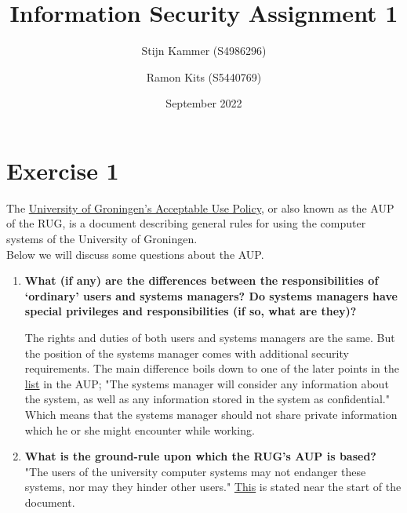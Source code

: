 \documentclass{report}
\title{Information Security Assignment 1}
\author{
    Stijn Kammer (S4986296)
    \and Ramon Kits (S5440769)
}
\date{September 2022}
\begin{document}
\maketitle

\section*{Exercise 1}
The \href{
      https://www.rug.nl/society-business/centre-for-information-technology/security/aup/
}{University of Groningen's Acceptable Use Policy},
or also known as the AUP of the RUG, is a document describing general rules for
using the computer systems of the University of Groningen.\\
Below we will discuss some questions about the AUP.

\begin{enumerate}
      \item \textbf{What (if any) are the differences between the responsibilities of `ordinary'
                  users and systems managers? Do systems managers have special privileges
                  and responsibilities (if so, what are they)?}

            The rights and duties of both users and systems managers are the same.
            But the position of the systems manager comes with additional security requirements.
            The main difference boils down to one of the later points in the
            \href{
                  https://www.rug.nl/society-business/centre-for-information-technology/security/aup/#:~:text=systems%
            }{list}
            in the AUP;
            "The systems manager will consider any information about the system, as well as any
            information stored in the system as confidential." Which means that the systems manager
            should not share private information which he or she might encounter while working.

      \item \textbf{What is the ground-rule upon which the RUG's AUP is based?}
            "The users of the university computer systems may not endanger these systems, nor may they hinder other users."
            \href{
                  https://www.rug.nl/society-business/centre-for-information-technology/security/aup/#:~:text=the%
            }{This} is stated near the start of the document.


\end{enumerate}
\end{document}
